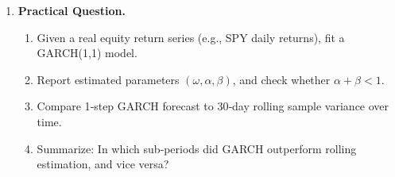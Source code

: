 \documentclass[11pt]{amsart}
\begin{document}
\begin{enumerate}[label=\arabic*.,noitemsep,left=0pt]
  \item \textbf{Practical Question.}\\
    \begin{enumerate}[noitemsep,left=1em]
      \item Given a real equity return series (e.g., SPY daily returns), fit a GARCH(1,1) model.
      \item Report estimated parameters $(\omega,\alpha,\beta)$, and check whether $\alpha + \beta < 1$.
      \item Compare 1‐step GARCH forecast to 30‐day rolling sample variance over time.
      \item Summarize: In which sub‐periods did GARCH outperform rolling estimation, and vice versa?
    \end{enumerate}
\end{enumerate}

\end{document}
